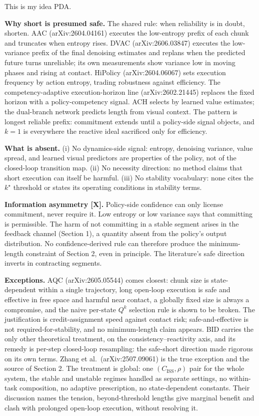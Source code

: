 This is my idea PDA. \documentclass[11pt]{article}
\newcommand{\Ciss}{C_{\mathrm{ISS}}}
\begin{document}
\textbf{Why short is presumed safe.} The shared rule: when reliability is in doubt, shorten. AAC (arXiv:2604.04161) executes the low-entropy prefix of each chunk and truncates when entropy rises. DVAC (arXiv:2606.03847) executes the low-variance prefix of the final denoising estimates and replans when the predicted future turns unreliable; its own measurements show variance low in moving phases and rising at contact. HiPolicy (arXiv:2604.06067) sets execution frequency by action entropy, trading robustness against efficiency. The competency-adaptive execution-horizon line (arXiv:2602.21445) replaces the fixed horizon with a policy-competency signal. ACH selects by learned value estimates; the dual-branch network predicts length from visual context. The pattern is longest reliable prefix: commitment extends until a policy-side signal objects, and $k=1$ is everywhere the reactive ideal sacrificed only for efficiency.

\textbf{What is absent.} (i) No dynamics-side signal: entropy, denoising variance, value spread, and learned visual predictors are properties of the policy, not of the closed-loop transition map. (ii) No necessity direction: no method claims that short execution can itself be harmful. (iii) No stability vocabulary: none cites the $k^\star$ threshold or states its operating conditions in stability terms.

\textbf{Information asymmetry [X].} Policy-side confidence can only license commitment, never require it. Low entropy or low variance says that committing is permissible. The harm of not committing in a stable segment arises in the feedback channel (Section 1), a quantity absent from the policy's output distribution. No confidence-derived rule can therefore produce the minimum-length constraint of Section 2, even in principle. The literature's safe direction inverts in contracting segments.

\textbf{Exceptions.} AQC (arXiv:2605.05544) comes closest: chunk size is state-dependent within a single trajectory, long open-loop execution is safe and effective in free space and harmful near contact, a globally fixed size is always a compromise, and the naive per-state $Q^k$ selection rule is shown to be broken. The justification is credit-assignment speed against contact risk; safe-and-effective is not required-for-stability, and no minimum-length claim appears. BID carries the only other theoretical treatment, on the consistency--reactivity axis, and its remedy is per-step closed-loop resampling: the safe-short direction made rigorous on its own terms. Zhang et al.\ (arXiv:2507.09061) is the true exception and the source of Section 2. The treatment is global: one $(\Ciss,\rho)$ pair for the whole system, the stable and unstable regimes handled as separate settings, no within-task composition, no adaptive prescription, no state-dependent constants. Their discussion names the tension, beyond-threshold lengths give marginal benefit and clash with prolonged open-loop execution, without resolving it.
\end{document}
